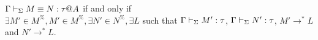 \begin{lemma}
	$\Gamma \vdash_\Sigma M \equiv N : \tau @A$ if and only if\\
	$\exists M' \in M^\%, M' \in M^\%, \exists N' \in N^\%, \exists L$
	such that $\Gamma \vdash_\Sigma M' : \tau$, $\Gamma \vdash_\Sigma N' : \tau$, $M' \longrightarrow^* L$ and $N' \longrightarrow^* L$.
\end{lemma}



%
% 
% 

